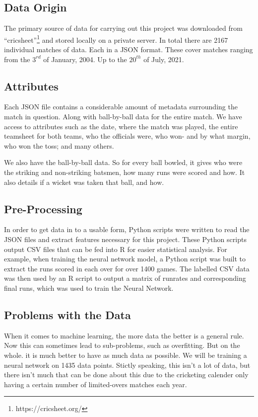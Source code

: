 \documentclass[11pt]{amsart}
\begin{document}
\subsection{Data Origin}
The primary source of data for carrying out this project was downloaded from ``cricsheet''\footnote{https://cricsheet.org/}
and stored locally on a private server. In total there are 2167 individual matches of data. Each in a JSON format.
These cover matches ranging from the $3^{rd}$ of January, 2004. Up to the $20^{th}$ of July, 2021.

\subsection{Attributes}
Each JSON file contains a considerable amount of metadata surrounding the match in question. Along with 
ball-by-ball data for the entire match. We have access to attributes such as the date, where the match was played,
the entire teamsheet for both teams, who the officials were, who won- and by what margin, who won the toss; and many others.

We also have the ball-by-ball data. So for every ball bowled, it gives who were the striking and non-striking batsmen, how many runs
were scored and how. It also details if a wicket was taken that ball, and how.

\subsection{Pre-Processing}
In order to get data in to a usable form, Python scripts were written to read the JSON files and extract features necessary for this project.
These Python scripts output CSV files that can be fed into R for easier statistical analysis. For example, when training the neural network model,
a Python script was built to extract the runs scored in each over for over 1400 games. The labelled CSV data was then used by an R script to 
output a matrix of runrates and corresponding final runs, which was used to train the Neural Network.

\subsection{Problems with the Data}
When it comes to machine learning, the more data the better is a general rule. Now this can sometimes lead to sub-problems, such as overfitting. But on the whole.
it is much better to have as much data as possible. We will be training a neural network on 1435 data points. Stictly speaking, this isn't a lot of data, but there
isn't much that can be done about this due to the cricketing calender only having a certain number of limited-overs matches each year.
\end{document}
